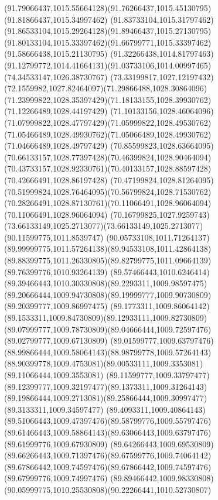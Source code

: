 {{		\curveto(91.79066437,1015.55664128)(91.76266437,1015.45130795)(91.81866437,1015.34997462)
		\curveto(91.83733104,1015.31797462)(91.86533104,1015.29264128)(91.89466437,1015.27130795)
		\curveto(91.80133104,1015.33397462)(91.66799771,1015.33397462)(91.58666438,1015.21130795)
		\curveto(91.32266438,1014.81797463)(91.12799772,1014.41664131)(91.03733106,1014.00997465)
		\lineto(74.34533147,1026.38730767)
		\curveto(73.33199817,1027.12197432)(72.1559982,1027.82464097)(71.29866488,1028.30864096)
		\curveto(71.23999822,1028.35397429)(71.18133155,1028.39930762)(71.12266489,1028.44197429)
		\curveto(71.10133156,1028.46064096)(71.07999822,1028.47797429)(71.05999822,1028.49530762)
		\curveto(71.05466489,1028.49930762)(71.05066489,1028.49930762)(71.04666489,1028.49797429)
		\curveto(70.85599823,1028.63664095)(70.66133157,1028.77397428)(70.46399824,1028.90464094)
		\curveto(70.43733157,1028.92330761)(70.40133157,1028.88597428)(70.42666491,1028.86197428)
		\curveto(70.47199824,1028.81264095)(70.51999824,1028.76464095)(70.56799824,1028.71530762)
		\curveto(70.28266491,1028.87130761)(70.11066491,1028.96064094)(70.11066491,1028.96064094)
		\curveto(70.16799825,1027.9259743)(73.66133149,1025.2713077)(73.66133149,1025.2713077)
		\lineto(90.11599775,1011.8539747)
		\curveto(90.05733108,1011.71264137)(89.99999775,1011.57264138)(89.94533108,1011.42864138)
		\curveto(89.88399775,1011.26330805)(89.82799775,1011.09664139)(89.76399776,1010.93264139)
		\curveto(89.57466443,1010.6246414)(89.39466443,1010.30330808)(89.2293311,1009.98597475)
		\curveto(89.20666444,1009.94730808)(89.19999777,1009.90730809)(89.20399777,1009.86997475)
		\curveto(89.1773311,1009.86064142)(89.1533311,1009.84730809)(89.12933111,1009.82730809)
		\curveto(89.07999777,1009.78730809)(89.04666444,1009.72597476)(89.02799777,1009.67130809)
		\curveto(89.01599777,1009.63797476)(88.99866444,1009.58064143)(88.98799778,1009.57264143)
		\curveto(88.90399778,1009.4753081)(89.00533111,1009.3353081)(89.11066444,1009.3553081)
		\curveto(89.11599777,1009.33797477)(89.12399777,1009.32197477)(89.1373311,1009.31264143)
		\curveto(89.19866444,1009.2713081)(89.25866444,1009.30997477)(89.3133311,1009.34597477)
		\curveto(89.4093311,1009.40864143)(89.51066443,1009.47397476)(89.58799776,1009.55797476)
		\curveto(89.61466443,1009.58864143)(89.63066443,1009.63797476)(89.61999776,1009.67930809)
		\curveto(89.64266443,1009.69530809)(89.66266443,1009.71397476)(89.67599776,1009.74064142)
		\curveto(89.67866442,1009.74597476)(89.67866442,1009.74597476)(89.67999776,1009.74997476)
		\curveto(89.89466442,1009.98330808)(90.05999775,1010.25530808)(90.22266441,1010.52730807)
}}
